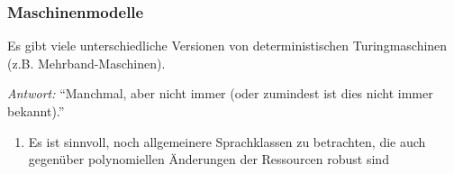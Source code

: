 \documentclass[onlymath]{beamer}
\begin{document}
\begin{frame}\frametitle{Maschinenmodelle}

Es gibt viele unterschiedliche Versionen von deterministischen Turingmaschinen (z.B. Mehrband-Maschinen).\\

\pause

\emph{Antwort:} "`Manchmal, aber nicht immer (oder zumindest ist dies nicht immer bekannt)."'

\pause

\begin{enumerate}[$\leadsto$]
\item Es ist sinnvoll, \alert{noch allgemeinere Sprachklassen} zu betrachten, die auch gegenüber polynomiellen Änderungen der Ressourcen robust sind
\end{enumerate}

\end{frame}
\end{document}
